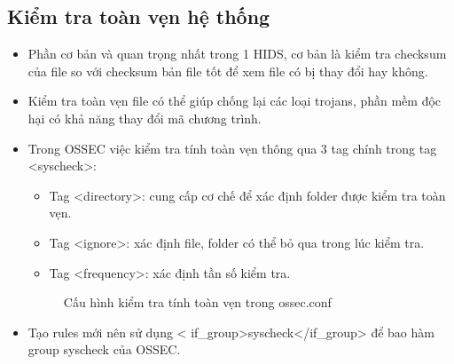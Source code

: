   \subsection{Kiểm tra toàn vẹn hệ thống}
  \begin{itemize}
    \item Phần cơ bản và quan trọng nhất trong 1 HIDS, cơ bản là kiểm tra
    checksum của file so với checksum bản file tốt để xem file có bị thay đổi hay không.
    \item Kiểm tra toàn vẹn file có thể giúp chống lại các loại trojans, phần
    mềm độc hại có khả năng thay đổi mã chương trình.
    \item Trong OSSEC việc kiểm tra tính toàn vẹn thông qua 3 tag chính trong
    tag \textless syscheck\textgreater:
    \begin{itemize}
      \item Tag \textless directory\textgreater: cung cấp cơ chế để xác định
      folder được kiểm tra toàn vẹn.
      \item Tag \textless ignore\textgreater: xác định file, folder có thể bỏ qua trong
      lúc kiểm tra.
      \item Tag \textless frequency\textgreater: xác định tần số kiểm tra.
    \end{itemize}
    \begin{figure}[h!]
	\centering 
	\caption{Cấu hình kiểm tra tính toàn vẹn trong ossec.conf}
  \end{figure}
    \item Tạo rules mới nên sử dụng \textless
    if\_group\textgreater syscheck\textless /if\_group\textgreater{} để bao hàm
    group syscheck của OSSEC.
  \end{itemize}
